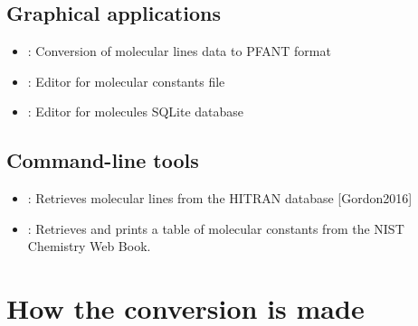 \documentclass[letterpaper,10pt,english]{sphinxmanual}
\begin{document}
\subsection{Graphical applications}
\label{\detokenize{convmol:graphical-applications}}\begin{itemize}
\item {} 
{\hyperref[\detokenize{autoscripts/script-convmol::doc}]{}}: Conversion of molecular lines data to PFANT format

\item {} 
{\hyperref[\detokenize{autoscripts/script-mced::doc}]{}}: Editor for molecular constants file

\item {} 
{\hyperref[\detokenize{autoscripts/script-moldbed::doc}]{}}: Editor for molecules SQLite database

\end{itemize}


\subsection{Command-line tools}
\label{\detokenize{convmol:command-line-tools}}\begin{itemize}
\item {} 
{\hyperref[\detokenize{autoscripts/script-hitran-scraper::doc}]{}}: Retrieves molecular lines from the HITRAN database {[}Gordon2016{]}

\item {} 
{\hyperref[\detokenize{autoscripts/script-nist-scraper::doc}]{}}: Retrieves and prints a table of molecular constants from the NIST Chemistry Web Book.

\end{itemize}


\section{How the conversion is made}
\label{\detokenize{convmol:how-the-conversion-is-made}}
\end{document}
